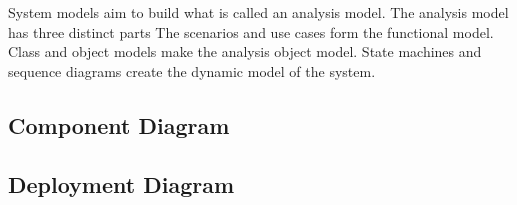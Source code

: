System models aim to build what is called an analysis model.
The analysis model has three distinct parts
The scenarios and use cases form the functional model.
Class and object models make the analysis object model.
State machines and sequence diagrams create the dynamic model of the system.  \cite{book:bruegge}











\subsection{Component Diagram}
\subsection{Deployment Diagram}

